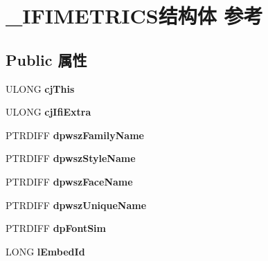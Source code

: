 \hypertarget{struct___i_f_i_m_e_t_r_i_c_s}{}\section{\+\_\+\+I\+F\+I\+M\+E\+T\+R\+I\+C\+S结构体 参考}
\label{struct___i_f_i_m_e_t_r_i_c_s}
\subsection*{Public 属性}
\begin{DoxyCompactItemize}
\item 
\mbox{\label{struct___i_f_i_m_e_t_r_i_c_s_a104c604fad311af705b7153829ea1d4b}} 
U\+L\+O\+NG {\bfseries cj\+This}
\item 
\mbox{\label{struct___i_f_i_m_e_t_r_i_c_s_a1d33c349bd35ff09671036e993dbf485}} 
U\+L\+O\+NG {\bfseries cj\+Ifi\+Extra}
\item 
\mbox{\label{struct___i_f_i_m_e_t_r_i_c_s_a3499f4c631cea169a6054adc4b19bc44}} 
P\+T\+R\+D\+I\+FF {\bfseries dpwsz\+Family\+Name}
\item 
\mbox{\label{struct___i_f_i_m_e_t_r_i_c_s_a37b61d0ff5407eb8704efb7ff581f2b8}} 
P\+T\+R\+D\+I\+FF {\bfseries dpwsz\+Style\+Name}
\item 
\mbox{\label{struct___i_f_i_m_e_t_r_i_c_s_ac4286885bfe1c74b21d46fa6b5752f7a}} 
P\+T\+R\+D\+I\+FF {\bfseries dpwsz\+Face\+Name}
\item 
\mbox{\label{struct___i_f_i_m_e_t_r_i_c_s_a323e58352daa907b517db805513ccafc}} 
P\+T\+R\+D\+I\+FF {\bfseries dpwsz\+Unique\+Name}
\item 
\mbox{\label{struct___i_f_i_m_e_t_r_i_c_s_aee0486c21f8a589fca568cd64c8d0991}} 
P\+T\+R\+D\+I\+FF {\bfseries dp\+Font\+Sim}
\item 
\mbox{\label{struct___i_f_i_m_e_t_r_i_c_s_ae19be24d2a5ef399998fa10fc05c00b9}} 
L\+O\+NG {\bfseries l\+Embed\+Id}
\item 

\end{DoxyCompactItemize}
